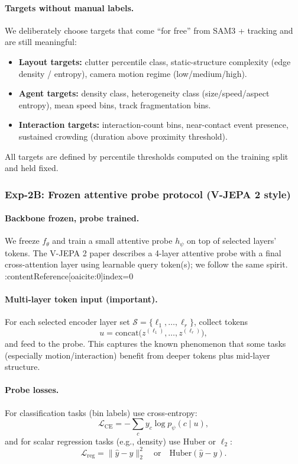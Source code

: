 \paragraph{Targets without manual labels.}
We deliberately choose targets that come “for free” from SAM3 + tracking and are still meaningful:
\begin{itemize}[leftmargin=*,itemsep=2pt]
  \item \textbf{Layout targets:} clutter percentile class, static-structure complexity (edge density / entropy), camera motion regime (low/medium/high).
  \item \textbf{Agent targets:} density class, heterogeneity class (size/speed/aspect entropy), mean speed bins, track fragmentation bins.
  \item \textbf{Interaction targets:} interaction-count bins, near-contact event presence, sustained crowding (duration above proximity threshold).
\end{itemize}
All targets are defined by percentile thresholds computed on the training split and held fixed.

\subsubsection{Exp-2B: Frozen attentive probe protocol (V-JEPA 2 style)}

\paragraph{Backbone frozen, probe trained.}
We freeze $f_{\theta}$ and train a small attentive probe $h_{\psi}$ on top of selected layers’ tokens. The V-JEPA 2 paper describes a 4-layer attentive probe with a final cross-attention layer using learnable query token(s); we follow the same spirit. :contentReference[oaicite:0]{index=0}

\paragraph{Multi-layer token input (important).}
For each selected encoder layer set $\mathcal{S}=\{\ell_1,\dots,\ell_r\}$, collect tokens
\[
u = \mathrm{concat}\big(z^{(\ell_1)},\dots,z^{(\ell_r)}\big),
\]
and feed to the probe. This captures the known phenomenon that some tasks (especially motion/interaction) benefit from deeper tokens plus mid-layer structure.

\paragraph{Probe losses.}
For classification tasks (bin labels) use cross-entropy:
\[
\mathcal{L}_{\mathrm{CE}} = -\sum_{c} y_c \log p_{\psi}(c\mid u),
\]
and for scalar regression tasks (e.g., density) use Huber or $\ell_2$:
\[
\mathcal{L}_{\mathrm{reg}} = \| \hat{y} - y\|_2^2 \quad \text{or} \quad \mathrm{Huber}(\hat{y}-y).
\]

